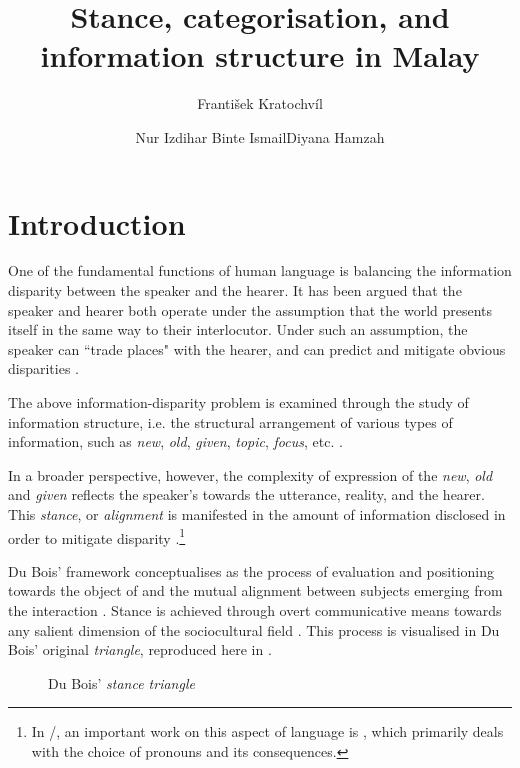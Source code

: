 \documentclass[output=paper
,modfonts
,nonflat]{langsci/langscibook}
\title{Stance, categorisation, and information structure in Malay}
\author{František Kratochvíl\affiliation{Palack\'{y} University, Olomouc, Czech Republic}\and Nur Izdihar Binte Ismail\affiliation{Nanyang Technological University, Singapore}\lastand Diyana Hamzah\affiliation{Temasek Laboratories, Singapore}}
\begin{document}
\maketitle

\section{Introduction}\label{section:Introduction}\largerpage[2]
One of the fundamental functions of human language is balancing the information disparity between the speaker and the hearer. It has been argued that the speaker and hearer both operate under the assumption that the world presents itself in the same way to their interlocutor. Under such an assumption, the speaker can ``trade places" with the hearer, and can predict and mitigate obvious disparities \citep{Rommetveit1976, Zlatev2008, Duranti2009, Duranti2010}. 

The above information-disparity problem is examined through the study of information structure, i.e. the structural arrangement of various types of information, such as \emph{new}, \emph{old}, \emph{given}, \emph{topic}, \emph{focus}, etc. \citep[cf.][]{Prince1981, Gundel1993, Lambrecht1994, Gundel2004}.

In a broader perspective, however, the complexity of expression of the \emph{new}, \emph{old} and \emph{given} reflects the speaker's  towards the utterance, reality, and the hearer. This \emph{stance}, or \emph{alignment} is manifested in the amount of information disclosed in order to mitigate disparity \citep[cf.][]{DuBois2007}.\footnote{In /, an important work on this aspect of language is \cite{Englebretson2007b}, which primarily deals with the choice of pronouns and its consequences.}

Du Bois' framework conceptualises  as the process of evaluation and positioning towards the object of  and the mutual alignment between subjects emerging from the interaction \citep[171]{DuBois2007}. Stance is achieved through overt communicative means towards any salient dimension of the sociocultural field \citep[163]{DuBois2007}. This process is visualised in Du Bois' original \emph{ triangle}, reproduced here in . 

\begin{figure}
\caption{Du Bois' \emph{stance triangle} \citep[161]{DuBois2007}\label{fig:StanceTriangle}}
\end{figure}
\end{document}
